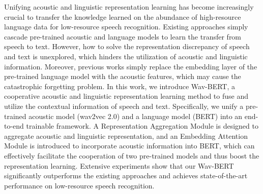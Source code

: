 Unifying acoustic and linguistic representation learning has become increasingly crucial to transfer the knowledge learned on the abundance of high-resource language data for low-resource speech recognition.  Existing approaches simply cascade pre-trained acoustic and language models to learn the transfer from speech to text. However, how to solve the representation discrepancy of speech and text is unexplored, which hinders the utilization of acoustic and linguistic information. Moreover, previous works simply replace the embedding layer of the pre-trained language model with the acoustic features,  which may cause the catastrophic forgetting problem. In this work, we introduce Wav-BERT, a cooperative acoustic and linguistic representation learning method to fuse and utilize the contextual information of speech and text.  Specifically, we unify a pre-trained acoustic model (wav2vec 2.0) and a language model (BERT) into an end-to-end trainable framework. A Representation Aggregation Module is designed to aggregate acoustic and linguistic representation, and an Embedding Attention Module is introduced to incorporate acoustic information into BERT, which can effectively facilitate the cooperation of two pre-trained models and thus boost the representation learning. Extensive experiments show that our Wav-BERT significantly outperforms the existing approaches and achieves state-of-the-art performance on low-resource speech recognition.
